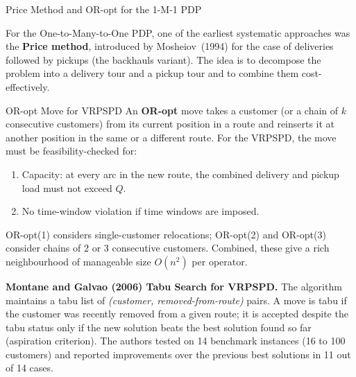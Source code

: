 \documentclass[aspectratio=169,10pt]{beamer}
\begin{document}
\begin{frame}[allowframebreaks]{Price Method and OR-opt for the 1-M-1 PDP}

  For the One-to-Many-to-One PDP, one of the earliest systematic approaches was the
  \textbf{Price method}, introduced by Mosheiov~(1994) for the case of deliveries followed
  by pickups (the backhauls variant). The idea is to decompose the problem into a delivery
  tour and a pickup tour and to combine them cost-effectively.

  \begin{block}{OR-opt Move for VRPSPD}
    An \textbf{OR-opt} move takes a customer (or a chain of $k$ consecutive customers)
    from its current position in a route and reinserts it at another position in the
    same or a different route. For the VRPSPD, the move must be feasibility-checked for:
    \begin{enumerate}
      \item Capacity: at every arc in the new route, the combined delivery and pickup
            load must not exceed $Q$.
      \item No time-window violation if time windows are imposed.
    \end{enumerate}
    OR-opt(1) considers single-customer relocations; OR-opt(2) and OR-opt(3) consider
    chains of 2 or 3 consecutive customers. Combined, these give a rich neighbourhood
    of manageable size $O(n^2)$ per operator.
  \end{block}

  \textbf{Montane and Galvao (2006) Tabu Search for VRPSPD.}  The algorithm maintains a
  tabu list of \emph{(customer, removed-from-route)} pairs. A move is tabu if the customer
  was recently removed from a given route; it is accepted despite the tabu status only if
  the new solution beats the best solution found so far (aspiration criterion). The authors
  tested on 14 benchmark instances (16 to 100 customers) and reported improvements over
  the previous best solutions in 11 out of 14 cases.


\end{frame}
\end{document}
